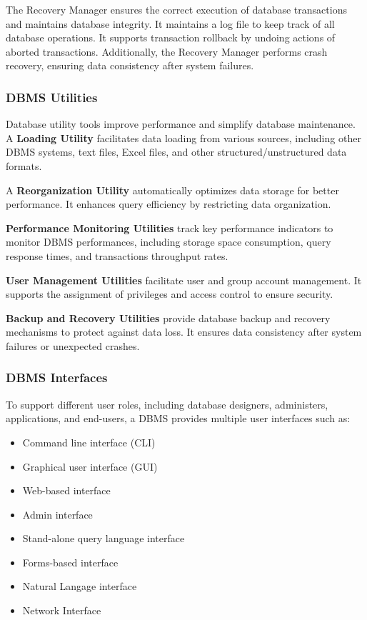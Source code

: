 \documentclass[11pt]{article}
\begin{document}
The Recovery Manager ensures the correct execution of database transactions and maintains database integrity. It maintains a log file to keep track of all database operations. It supports transaction rollback by undoing actions of aborted transactions. Additionally, the Recovery Manager performs crash recovery, ensuring data consistency after system failures.

\vspace{11pt}
\subsubsection{DBMS Utilities}
\vspace{11pt}

Database utility tools improve performance and simplify database maintenance. A \textbf{Loading Utility} facilitates data loading from various sources, including other DBMS systems, text files, Excel files, and other structured/unstructured data formats.

A \textbf{Reorganization Utility} automatically optimizes data storage for better performance. It enhances query efficiency by restricting data organization.

\textbf{Performance Monitoring Utilities} track key performance indicators to monitor DBMS performances, including storage space consumption, query response times, and transactions throughput rates.

\textbf{User Management Utilities} facilitate user and group account management. It supports the assignment of privileges and access control to ensure security.

\textbf{Backup and Recovery Utilities} provide database backup and recovery mechanisms to protect against data loss. It ensures data consistency after system failures or unexpected crashes.

\vspace{11pt}
\subsubsection{DBMS Interfaces}
\vspace{11pt}

To support different user roles, including database designers, administers, applications, and end-users, a DBMS provides multiple user interfaces such as:
\begin{itemize}
    \item Command line interface (CLI)
    \item Graphical user interface (GUI)
    \item Web-based interface
    \item Admin interface
    \item Stand-alone query language interface
    \item Forms-based interface
    \item Natural Langage interface
    \item Network Interface
\end{itemize}
\end{document}
